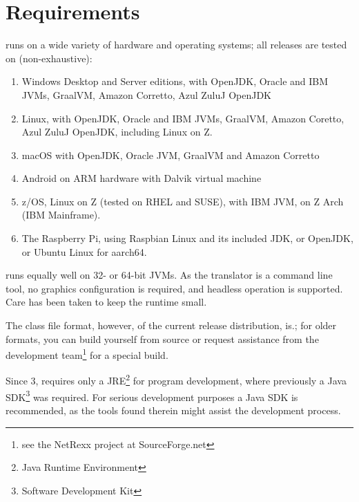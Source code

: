\chapter{Requirements}
\nr{}  runs on a wide variety of
hardware and operating systems; all releases are tested on (non-exhaustive):
\begin{enumerate}
\item Windows Desktop and Server editions, with OpenJDK, Oracle and
  IBM JVMs, GraalVM, Amazon Corretto, Azul ZuluJ OpenJDK
\item Linux, with OpenJDK, Oracle and IBM JVMs, GraalVM, Amazon
  Coretto, Azul ZuluJ OpenJDK, including Linux on Z.
\item macOS with OpenJDK,  Oracle JVM, GraalVM and Amazon Corretto
\item Android on ARM hardware with Dalvik virtual machine
\item z/OS, Linux on Z (tested on RHEL and SUSE), with IBM JVM, on Z
  Arch (IBM Mainframe).
\item The Raspberry Pi, using Raspbian Linux and its included JDK, or
  OpenJDK, or Ubuntu Linux for aarch64.
\end{enumerate}
\nr{} runs equally well on 32- or 64-bit JVMs. As the translator is
a command line tool, no graphics configuration is required, and
headless operation is supported. Care has been taken to keep the \nr{} runtime small.

The class file format, however, of the current release distribution,
is.; for older formats, you
can build \nr{} yourself from source or request assistance from the development
team\footnote{see the NetRexx project at SourceForge.net} for a special build.
\begin{shaded}\noindent
Since \nr{} 3, \nr{} requires only a
JRE\footnote{Java Runtime Environment} for program development, where previously a
Java SDK\footnote{Software Development Kit} was required. For serious development
purposes a Java SDK is recommended, as the tools found therein might
assist the development process.
\end{shaded}\indent


